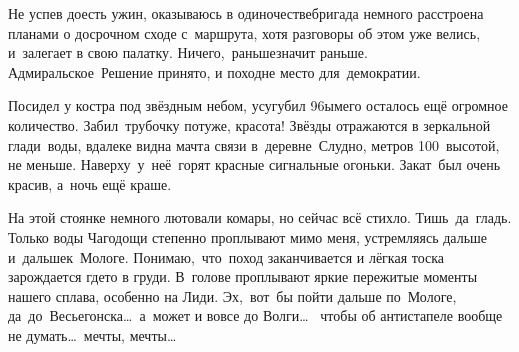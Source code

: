 Не успев доесть ужин, оказываюсь в одиночестве\mdash бригада немного расстроена планами о досрочном сходе с~маршрута, хотя разговоры об этом уже велись, и~залегает в свою палатку. Ничего,~раньше\mdash значит раньше. Адмиральское~Решение принято, и поход\mdash не место для~демократии. 

Посидел у костра под звёздным небом, усугубил 96\sdash ым\mdash его осталось ещё огромное количество. Забил~трубочку потуже, красота! Звёзды отражаются в зеркальной глади~воды, вдалеке видна мачта связи в~деревне~Слудно, метров 100~высотой, не меньше. Наверху~у~неё~горят красные сигнальные огоньки. Закат~был очень красив, а~ночь ещё краше. 

На этой стоянке немного лютовали комары, но сейчас всё стихло. Тишь~да~гладь. Только воды Чагодощи степенно проплывают мимо меня, устремляясь дальше и~дальше\mdash к~Мологе. Понимаю,~что~поход заканчивается и лёгкая тоска зарождается где\sdash то в груди. В~голове проплывают яркие пережитые моменты нашего сплава, особенно на Лиди. 
\newpage 
Эх,~вот~бы пойти дальше по~Мологе, да~до~Весьегонска\ldots~а~может и вовсе до Волги\ldots~ чтобы об антистапеле вообще не думать\ldots~мечты, мечты\ldots

\begin{center}
\end{center}
